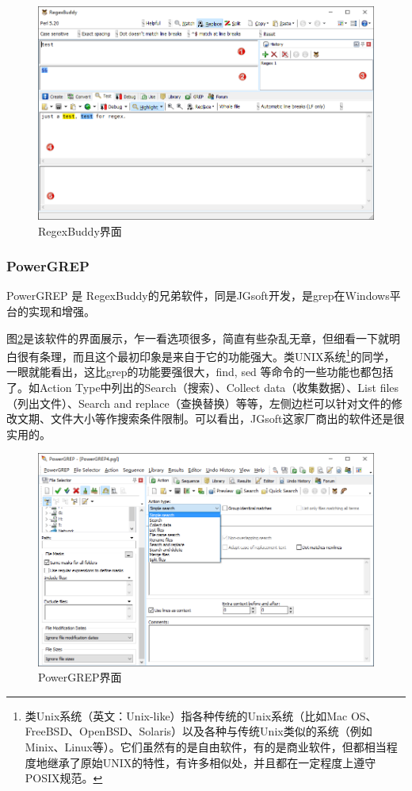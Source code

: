 \documentclass[12pt,a4paper,twoside]{ctexart}
\begin{document}
\begin{figure}[htbp]
  \centering
  \includegraphics{FIG/regexbuddy.png}
  \caption{RegexBuddy界面}
  \label{fig:regexbuddy}
\end{figure}

\clearpage{}

\subsubsection{PowerGREP}
\label{sec:powergrep}

PowerGREP 是 RegexBuddy的兄弟软件，同是JGsoft开发，是grep在Windows平台的实现和增强。\par
图\ref{fig:powergrep}是该软件的界面展示，乍一看选项很多，简直有些杂乱无章，但细看一下就明白很有条理，而且这个最初印象是来自于它的功能强大。类UNIX系统\footnote{类Unix系统（英文：Unix-like）指各种传统的Unix系统（比如Mac OS、FreeBSD、OpenBSD、Solaris）以及各种与传统Unix类似的系统（例如Minix、Linux等）。它们虽然有的是自由软件，有的是商业软件，但都相当程度地继承了原始UNIX的特性，有许多相似处，并且都在一定程度上遵守POSIX规范。}的同学，一眼就能看出，这比grep的功能要强很大，find, sed 等命令的一些功能也都包括了。如Action Type中列出的Search（搜索）、Collect data（收集数据）、List files（列出文件）、Search and replace（查换替换）等等，左侧边栏可以针对文件的修改文期、文件大小等作搜索条件限制。可以看出，JGsoft这家厂商出的软件还是很实用的。 \par

\begin{figure}[htbp]
  \centering
  \includegraphics{FIG/powergrep.png}
  \caption{PowerGREP界面}
  \label{fig:powergrep}
\end{figure}
\end{document}

